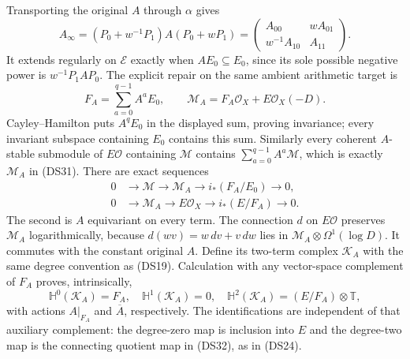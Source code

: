 Transporting the original $A$ through $\alpha$ gives
\[
 \widehat A_\infty
 =(P_0+w^{-1}P_1)A(P_0+wP_1)
 =\begin{pmatrix}A_{00}&wA_{01}\\w^{-1}A_{10}&A_{11}\end{pmatrix}.
 \tag{DS30}
\]
It extends regularly on $\mathscr E$ exactly when $AE_0\subseteq E_0$,
since its sole possible negative power is $w^{-1}P_1AP_0$.
The explicit repair on the same ambient arithmetic target is
\[
 F_A=\sum_{a=0}^{q-1}A^aE_0,\qquad
 \mathcal M_A=F_A\mathcal O_X+E\mathcal O_X(-D).
 \tag{DS31}
\]
Cayley--Hamilton puts $A^qE_0$ in the displayed sum, proving
invariance; every invariant subspace containing $E_0$ contains this
sum.  Similarly every coherent $A$-stable submodule of $E\mathcal O$
containing $\mathcal M$ contains $\sum_{a=0}^{q-1}A^a\mathcal M$,
which is exactly $\mathcal M_A$ in (DS31).  There are exact sequences
\[
\begin{split}
0&\to\mathcal M\to\mathcal M_A\to i_*(F_A/E_0)\to0,\\
0&\to\mathcal M_A\to E\mathcal O_X\to i_*(E/F_A)\to0.
\end{split}\tag{DS32}
\]
The second is $A$ equivariant on every term.  The connection $d$ on
$E\mathcal O$ preserves $\mathcal M_A$ logarithmically, because
$d(wv)=w\,dv+v\,dw$ lies in
$\mathcal M_A\otimes\Omega^1(\log D)$.  It commutes with the
constant original $A$.  Define its two-term complex $\mathscr K_A$
with the same degree convention as (DS19).  Calculation with any
vector-space complement of $F_A$ proves, intrinsically,
\[
 \mathbb H^0(\mathscr K_A)=F_A,\quad
 \mathbb H^1(\mathscr K_A)=0,\quad
 \mathbb H^2(\mathscr K_A)=(E/F_A)\otimes\mathbb T,
 \tag{DS33}
\]
with actions $A|_{F_A}$ and $\overline A$, respectively.  The
identifications are independent of that auxiliary complement: the
degree-zero map is inclusion into $E$ and the degree-two map is the
connecting quotient map in (DS32), as in (DS24).

